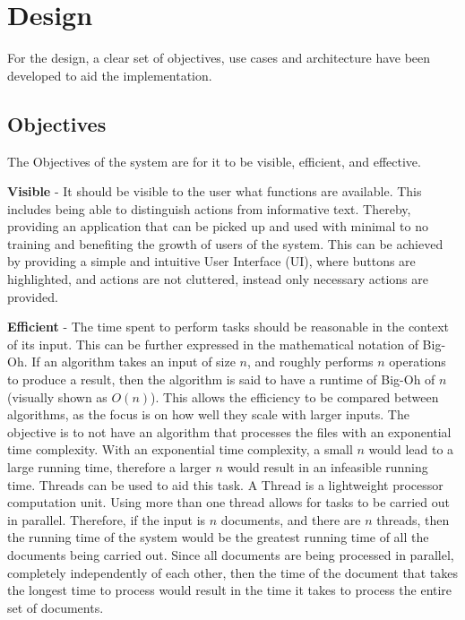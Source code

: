 \chapter{Design}
\par For the design, a clear set of objectives, use cases and architecture have been developed to aid the implementation.
\section{Objectives}
\par The Objectives of the system are for it to be visible, efficient, and effective.
\par \textbf{Visible} -  It should be visible to the user what  functions are available. This includes being able to distinguish actions from informative text. Thereby, providing an application that can be picked up and used with minimal to no training and benefiting the growth of users of the system. This can be achieved by providing a simple and intuitive User Interface (UI), where buttons are highlighted, and actions are not cluttered, instead only necessary actions are provided. 

\par \textbf{Efficient} - The time spent to perform tasks should be reasonable in the context of its input. This can be further expressed in the mathematical notation of Big-Oh. If an algorithm takes an input of size $n$, and roughly performs $n$ operations to produce a result, then the algorithm is said to have a runtime of Big-Oh of $n$ (visually shown as $O(n)$). This allows the efficiency to be compared between algorithms, as the focus is on how well they scale with larger inputs. The objective is to not have an algorithm that processes the files with an exponential time complexity. With an exponential time complexity, a small $n$ would lead to a large running time, therefore a larger $n$ would result in an infeasible running time. Threads can be used to aid this task. A Thread is a lightweight processor computation unit. Using more than one thread allows for tasks to be carried out in parallel. Therefore, if the input is $n$ documents, and there are $n$ threads, then the running time of the system would be the greatest running time of all the documents being carried out. Since all documents are being processed in parallel, completely independently of each other, then the time of the document that takes the longest time to process would result in the time it takes to process the entire set of documents.

